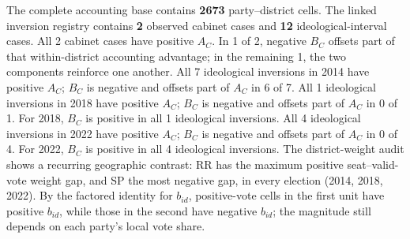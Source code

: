The complete accounting base contains \textbf{2673} party--district cells. The linked inversion registry contains \textbf{2} observed cabinet cases and \textbf{12} ideological-interval cases.
All 2 cabinet cases have positive \(A_C\). In 1 of 2, negative \(B_C\) offsets part of that within-district accounting advantage; in the remaining 1, the two components reinforce one another.
All 7 ideological inversions in 2014 have positive \(A_C\); \(B_C\) is negative and offsets part of \(A_C\) in 6 of 7.
All 1 ideological inversions in 2018 have positive \(A_C\); \(B_C\) is negative and offsets part of \(A_C\) in 0 of 1.
For 2018, \(B_C\) is positive in all 1 ideological inversions.
All 4 ideological inversions in 2022 have positive \(A_C\); \(B_C\) is negative and offsets part of \(A_C\) in 0 of 4.
For 2022, \(B_C\) is positive in all 4 ideological inversions.
The district-weight audit shows a recurring geographic contrast: RR has the maximum positive seat--valid-vote weight gap, and SP the most negative gap, in every election (2014, 2018, 2022). By the factored identity for \(b_{id}\), positive-vote cells in the first unit have positive \(b_{id}\), while those in the second have negative \(b_{id}\); the magnitude still depends on each party's local vote share.
